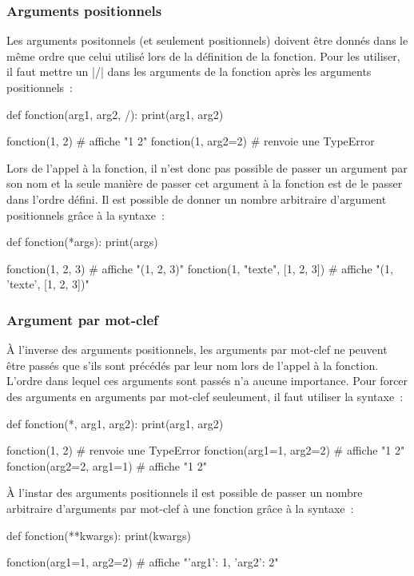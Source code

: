 		\subsubsection{Arguments positionnels}
		Les arguments positonnels (et seulement positionnels) doivent être donnés dans le même ordre que celui utilisé lors de la définition de la fonction. Pour les utiliser, il faut mettre un \python|/| dans les arguments de la fonction après les arguments positionnels~:
		\begin{pythoncode}
			def fonction(arg1, arg2, /):
			    print(arg1, arg2)
			
			fonction(1, 2) # affiche "1 2"
			fonction(1, arg2=2) # renvoie une TypeError
		\end{pythoncode}
		Lors de l'appel à la fonction, il n'est donc pas possible de passer un argument par son nom et la seule manière de passer cet argument à la fonction est de le passer dans l'ordre défini. Il est possible de donner un nombre arbitraire d'argument positionnels grâce à la syntaxe~:
		\begin{pythoncode}
			def fonction(*args):
			    print(args)
			
			fonction(1, 2, 3) # affiche "(1, 2, 3)"
			fonction(1, "texte", [1, 2, 3]) # affiche "(1, 'texte', [1, 2, 3])"
		\end{pythoncode}
		
		\subsubsection{Argument par mot-clef}
		À l'inverse des arguments positionnels, les arguments par mot-clef ne peuvent être passés que s'ils sont précédés par leur nom lors de l'appel à la fonction. L'ordre dans lequel ces arguments sont passés n'a aucune importance. Pour forcer des arguments en arguments par mot-clef seuleument, il faut utiliser la syntaxe~:
		\begin{pythoncode}
			def fonction(*, arg1, arg2):
			    print(arg1, arg2)
			
			fonction(1, 2) # renvoie une TypeError
			fonction(arg1=1, arg2=2) # affiche "1 2"
			fonction(arg2=2, arg1=1) # affiche "1 2"
		\end{pythoncode}
		À l'instar des arguments positionnels il est possible de passer un nombre arbitraire d'arguments par mot-clef à une fonction grâce à la syntaxe~:
		\begin{pythoncode}
			def fonction(**kwargs):
			    print(kwargs)
			
			fonction(arg1=1, arg2=2) # affiche "{'arg1': 1, 'arg2': 2}"
		\end{pythoncode}
		
